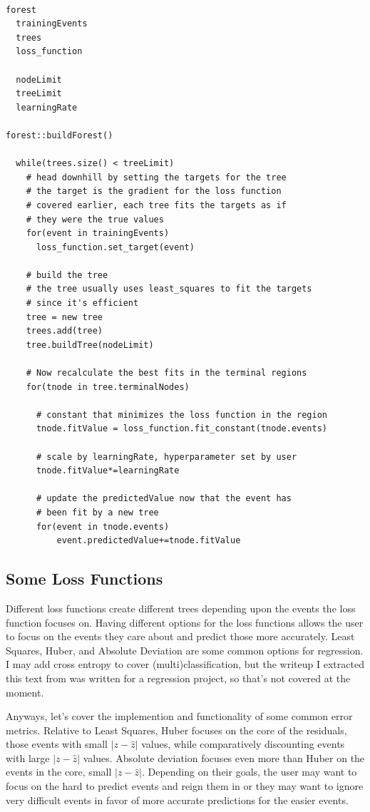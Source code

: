 \documentclass[12pt]{article}
\begin{document}
\begin{verbatim}

forest
  trainingEvents
  trees
  loss_function

  nodeLimit
  treeLimit
  learningRate

forest::buildForest()

  while(trees.size() < treeLimit)
    # head downhill by setting the targets for the tree
    # the target is the gradient for the loss function
    # covered earlier, each tree fits the targets as if
    # they were the true values
    for(event in trainingEvents)
      loss_function.set_target(event)  

    # build the tree
    # the tree usually uses least_squares to fit the targets
    # since it's efficient
    tree = new tree
    trees.add(tree)
    tree.buildTree(nodeLimit)

    # Now recalculate the best fits in the terminal regions
    for(tnode in tree.terminalNodes)

      # constant that minimizes the loss function in the region
      tnode.fitValue = loss_function.fit_constant(tnode.events)

      # scale by learningRate, hyperparameter set by user
      tnode.fitValue*=learningRate
  
      # update the predictedValue now that the event has 
      # been fit by a new tree
      for(event in tnode.events)
          event.predictedValue+=tnode.fitValue

\end{verbatim}

\subsection{Some Loss Functions}
Different loss functions create different trees depending upon the events the loss function focuses on. Having different options for the loss functions allows the user to focus on the events they care about and predict those more accurately. Least Squares, Huber, and Absolute Deviation are some common options for regression. I may add cross entropy to cover (multi)classification, but the writeup I extracted this text from was written for a regression project, so that's not covered at the moment. 

Anyways, let's cover the implemention and functionality of some common error metrics. Relative to Least Squares, Huber focuses on the core of the residuals, those events with small $|z-\hat{z}|$ values, while comparatively discounting events with large $|z-\hat{z}|$ values. Absolute deviation focuses even more than Huber on the events in the core, small $|z-\hat{z}|$. Depending on their goals, the user may want to focus on the hard to predict events and reign them in or they may want to ignore very difficult events in favor of more accurate predictions for the easier events. 
\end{document}
